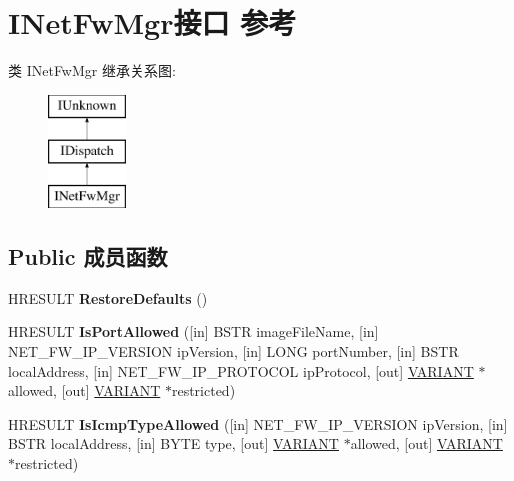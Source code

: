 \hypertarget{interface_i_net_fw_mgr}{}\section{I\+Net\+Fw\+Mgr接口 参考}
\label{interface_i_net_fw_mgr}
类 I\+Net\+Fw\+Mgr 继承关系图\+:\begin{figure}[H]
\begin{center}
\leavevmode
\includegraphics[height=3.000000cm]{interface_i_net_fw_mgr}
\end{center}
\end{figure}
\subsection*{Public 成员函数}
\begin{DoxyCompactItemize}
\item 
\mbox{\label{interface_i_net_fw_mgr_a4e01bb7556542f56304cae29ae837a82}} 
H\+R\+E\+S\+U\+LT {\bfseries Restore\+Defaults} ()
\item 
\mbox{\label{interface_i_net_fw_mgr_a9f0fdc6faa34cff384391f452e328c02}} 
H\+R\+E\+S\+U\+LT {\bfseries Is\+Port\+Allowed} (\mbox{[}in\mbox{]} B\+S\+TR image\+File\+Name, \mbox{[}in\mbox{]} N\+E\+T\+\_\+\+F\+W\+\_\+\+I\+P\+\_\+\+V\+E\+R\+S\+I\+ON ip\+Version, \mbox{[}in\mbox{]} L\+O\+NG port\+Number, \mbox{[}in\mbox{]} B\+S\+TR local\+Address, \mbox{[}in\mbox{]} N\+E\+T\+\_\+\+F\+W\+\_\+\+I\+P\+\_\+\+P\+R\+O\+T\+O\+C\+OL ip\+Protocol, \mbox{[}out\mbox{]} \hyperlink{structtag_v_a_r_i_a_n_t}{V\+A\+R\+I\+A\+NT} $\ast$allowed, \mbox{[}out\mbox{]} \hyperlink{structtag_v_a_r_i_a_n_t}{V\+A\+R\+I\+A\+NT} $\ast$restricted)
\item 
\mbox{\label{interface_i_net_fw_mgr_ae9335c9c21c413815f1b032cb75c9d0d}} 
H\+R\+E\+S\+U\+LT {\bfseries Is\+Icmp\+Type\+Allowed} (\mbox{[}in\mbox{]} N\+E\+T\+\_\+\+F\+W\+\_\+\+I\+P\+\_\+\+V\+E\+R\+S\+I\+ON ip\+Version, \mbox{[}in\mbox{]} B\+S\+TR local\+Address, \mbox{[}in\mbox{]} B\+Y\+TE type, \mbox{[}out\mbox{]} \hyperlink{structtag_v_a_r_i_a_n_t}{V\+A\+R\+I\+A\+NT} $\ast$allowed, \mbox{[}out\mbox{]} \hyperlink{structtag_v_a_r_i_a_n_t}{V\+A\+R\+I\+A\+NT} $\ast$restricted)
\end{DoxyCompactItemize}

